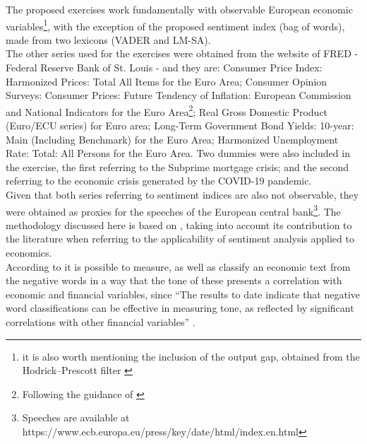 The proposed exercises work fundamentally with observable European economic variables\footnote{it is also worth mentioning the inclusion of the output gap, obtained from the Hodrick–Prescott filter \citep{hodrick1997postwar}}, with the exception of the proposed sentiment index (bag of words), made from two lexicons (VADER and LM-SA).\\

The other series used for the exercises were obtained from the website of FRED - Federal Reserve Bank of St. Louis - and they are: Consumer Price Index: Harmonized Prices: Total All Items for the Euro Area; Consumer Opinion Surveys: Consumer Prices: Future Tendency of Inflation: European Commission and National Indicators for the Euro Area\footnote{Following the guidance of \cite{shapiro2020measuring}}; Real Gross Domestic Product (Euro/ECU series) for Euro area; Long-Term Government Bond Yields: 10-year: Main (Including Benchmark) for the Euro Area; Harmonized Unemployment Rate: Total: All Persons for the Euro Area. Two dummies were also included in the exercise, the first referring to the Subprime mortgage crisis; and the second referring to the economic crisis generated by the COVID-19 pandemic.\\


Given that both series referring to sentiment indices are also not observable, they were obtained as proxies for the speeches of the European central bank\footnote{Speeches are available at https://www.ecb.europa.eu/press/key/date/html/index.en.html}. The methodology discussed here is based on \cite{loughran2011liability}, taking into account its contribution to the literature when referring to the applicability of sentiment analysis applied to economics.\\

According to \cite{loughran2011liability} it is possible to measure, as well as classify an economic text from the negative words in a way that the tone of these presents a correlation with economic and financial variables, since ``The results to date indicate that negative word classifications can be effective in measuring tone, as reflected by significant correlations with other financial variables'' \cite[p. 35]{loughran2011liability}.\\

